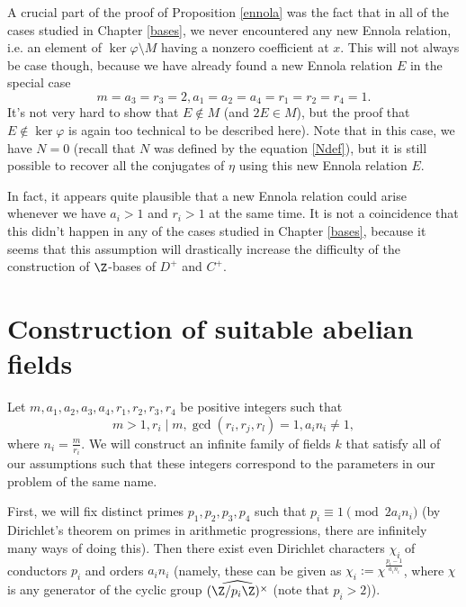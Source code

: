 \begin{rem}
A crucial part of the proof of Proposition \ref{ennola} was the fact that in all of the cases studied in Chapter \ref{bases}, we never encountered any new Ennola relation, i.e. an element of $\ker\varphi\setminus M$ having a nonzero coefficient at $x$. This will not always be case though, because we have already found a new Ennola relation $E$ in the special case $$m=a_3=r_3=2, a_1=a_2=a_4=r_1=r_2=r_4=1.$$ 
It's not very hard to show that $E\not\in M$ (and $2E\in M$), but the proof that $E\not\in\ker \varphi$ is again too technical to be described here). Note that in this case, we have $N=0$ (recall that $N$ was defined by the equation \eqref{Ndef}), but it is still possible to recover all the conjugates of $\eta$ using this new Ennola relation $E$.

In fact, it appears quite plausible that a new Ennola relation could arise whenever we have $a_i>1$ and $r_i>1$ at the same time. It is not a coincidence that this didn't happen in any of the cases studied in Chapter \ref{bases}, because it seems that this assumption will drastically increase the difficulty of the construction of $\Z$-bases of $D^+$ and $C^+$.
\end{rem}

\iffalse
\section{Construction of suitable abelian fields}
Let $m,a_1,a_2,a_3,a_4,r_1,r_2,r_3,r_4$ be positive integers such that 
$$m>1, r_i\mid m, \gcd(r_i,r_j,r_l)=1, a_in_i\neq 1,$$
where $n_i=\frac{m}{r_i}$.
We will construct an infinite family of fields $k$ that satisfy all of our assumptions such that these integers correspond to the parameters in our problem of the same name.

First, we will fix distinct primes $p_1,p_2,p_3,p_4$ such that $p_i\equiv 1\pmod{ 2a_in_i}$ (by Dirichlet's theorem on primes in arithmetic progressions, there are infinitely many ways of doing this). Then there exist even Dirichlet characters $\chi_i$ of conductors $p_i$ and orders $a_in_i$ (namely, these can be given as $\chi_i:=\chi^{\frac{p_i-1}{a_in_i}}$, where $\chi$ is any generator of the cyclic group $\widehat{(\Z/p_i\Z)^\times}$ (note that $p_i>2$)).


